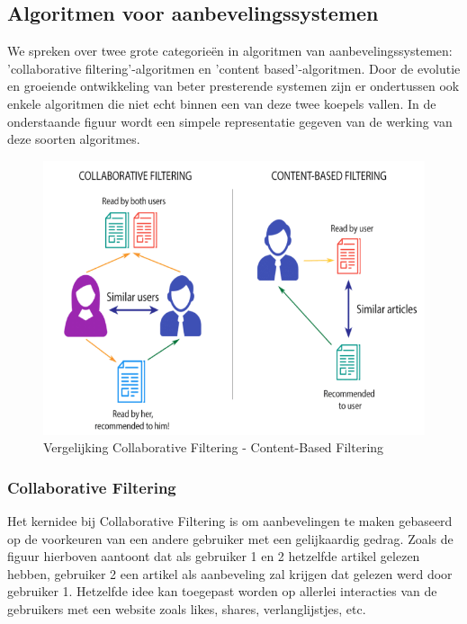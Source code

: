 \subsection{Algoritmen voor aanbevelingssystemen}
\label{sec:Algoritmen voor aanbevelingssystemen}

We spreken over twee grote categorieën in algoritmen van aanbevelingssystemen: 'collaborative filtering'-algoritmen en 'content based'-algoritmen.  \autocite{Adamovicius2005} Door de evolutie en groeiende ontwikkeling van beter presterende systemen zijn er ondertussen ook enkele algoritmen die niet echt binnen een van deze twee koepels vallen. In de onderstaande figuur wordt een simpele representatie gegeven van de werking van deze soorten algoritmes.

\begin{figure} [h!]
	\centering
	\includegraphics[width=\linewidth]{img/Content-based-filtering-and-Collaborative-filtering-recommendation}
	\caption[Vergelijking Collaborative Filtering - Content-Based Filtering]{Vergelijking Collaborative Filtering - Content-Based Filtering}
	\label{fig:CollaborativeVsContentBased}
\end{figure}
\newpage

	
\subsubsection{Collaborative Filtering}
\label{sec:Collaborative Filtering}

Het kernidee bij Collaborative Filtering \autocite{Schafera} is om aanbevelingen te maken gebaseerd op de voorkeuren van een andere gebruiker met een gelijkaardig gedrag. Zoals de figuur hierboven aantoont dat als gebruiker 1 en 2 hetzelfde artikel gelezen hebben, gebruiker 2 een artikel als aanbeveling zal krijgen dat gelezen werd door gebruiker 1. 
Hetzelfde idee kan toegepast worden op allerlei interacties van de gebruikers met een website zoals likes, shares, verlanglijstjes, etc.

